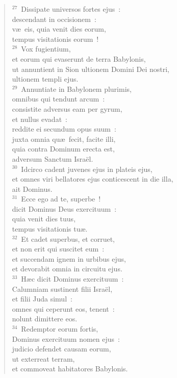 \begin{flushleft}
\begin{verse}
${}^{27}$~Dissipate universos fortes ejus~:\\ descendant in occisionem~:\\ v\ae\ eis, quia venit dies eorum,\\ tempus visitationis eorum~!\\
${}^{28}$~Vox fugientium,\\ et eorum qui evaserunt de terra Babylonis,\\ ut annuntient in Sion ultionem Domini Dei nostri,\\ ultionem templi ejus.\\
${}^{29}$~Annuntiate in Babylonem plurimis,\\ omnibus qui tendunt arcum~:\\ consistite adversus eam per gyrum,\\ et nullus evadat~:\\ reddite ei secundum opus suum~:\\ juxta omnia qu\ae\ fecit, facite illi,\\ quia contra Dominum erecta est,\\ adversum Sanctum Isra\"el.\\
${}^{30}$~Idcirco cadent juvenes ejus in plateis ejus,\\ et omnes viri bellatores ejus conticescent in die illa,\\ ait Dominus.\\
${}^{31}$~Ecce ego ad te, superbe~!\\ dicit Dominus Deus exercituum~:\\ quia venit dies tuus,\\ tempus visitationis tu\ae .\\
${}^{32}$~Et cadet superbus, et corruet,\\ et non erit qui suscitet eum~:\\ et succendam ignem in urbibus ejus,\\ et devorabit omnia in circuitu ejus.\\
${}^{33}$~H\ae c dicit Dominus exercituum~:\\ Calumniam sustinent filii Isra\"el,\\ et filii Juda simul~:\\ omnes qui ceperunt eos, tenent~:\\ nolunt dimittere eos.\\
${}^{34}$~Redemptor eorum fortis,\\ Dominus exercituum nomen ejus~:\\ judicio defendet causam eorum,\\ ut exterreat terram,\\ et commoveat habitatores Babylonis.\\

\end{verse}
\end{flushleft}
